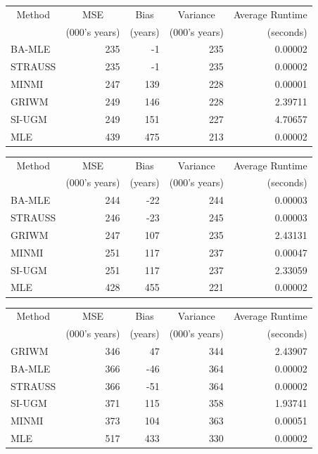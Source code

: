 \documentclass[
]{article}
\begin{document}
\begin{tabular}{lrrrr}
\toprule
\multicolumn{1}{c}{Method} & \multicolumn{1}{c}{MSE} & \multicolumn{1}{c}{Bias} & \multicolumn{1}{c}{Variance} & \multicolumn{1}{c}{Average Runtime} \\
\cmidrule(l{3pt}r{3pt}){1-1} \cmidrule(l{3pt}r{3pt}){2-2} \cmidrule(l{3pt}r{3pt}){3-3} \cmidrule(l{3pt}r{3pt}){4-4} \cmidrule(l{3pt}r{3pt}){5-5}
 & (000's years) & (years) & (000's years) & (seconds)\\
\midrule
BA-MLE & 235 & -1 & 235 & 0.00002\\
STRAUSS & 235 & -1 & 235 & 0.00002\\
MINMI & 247 & 139 & 228 & 0.00001\\
GRIWM & 249 & 146 & 228 & 2.39711\\
SI-UGM & 249 & 151 & 227 & 4.70657\\
\addlinespace
MLE & 439 & 475 & 213 & 0.00002\\
\bottomrule
\end{tabular}

\begin{tabular}{lrrrr}
\toprule
\multicolumn{1}{c}{Method} & \multicolumn{1}{c}{MSE} & \multicolumn{1}{c}{Bias} & \multicolumn{1}{c}{Variance} & \multicolumn{1}{c}{Average Runtime} \\
\cmidrule(l{3pt}r{3pt}){1-1} \cmidrule(l{3pt}r{3pt}){2-2} \cmidrule(l{3pt}r{3pt}){3-3} \cmidrule(l{3pt}r{3pt}){4-4} \cmidrule(l{3pt}r{3pt}){5-5}
 & (000's years) & (years) & (000's years) & (seconds)\\
\midrule
BA-MLE & 244 & -22 & 244 & 0.00003\\
STRAUSS & 246 & -23 & 245 & 0.00003\\
GRIWM & 247 & 107 & 235 & 2.43131\\
MINMI & 251 & 117 & 237 & 0.00047\\
SI-UGM & 251 & 117 & 237 & 2.33059\\
\addlinespace
MLE & 428 & 455 & 221 & 0.00002\\
\bottomrule
\end{tabular}

\begin{tabular}{lrrrr}
\toprule
\multicolumn{1}{c}{Method} & \multicolumn{1}{c}{MSE} & \multicolumn{1}{c}{Bias} & \multicolumn{1}{c}{Variance} & \multicolumn{1}{c}{Average Runtime} \\
\cmidrule(l{3pt}r{3pt}){1-1} \cmidrule(l{3pt}r{3pt}){2-2} \cmidrule(l{3pt}r{3pt}){3-3} \cmidrule(l{3pt}r{3pt}){4-4} \cmidrule(l{3pt}r{3pt}){5-5}
 & (000's years) & (years) & (000's years) & (seconds)\\
\midrule
GRIWM & 346 & 47 & 344 & 2.43907\\
BA-MLE & 366 & -46 & 364 & 0.00002\\
STRAUSS & 366 & -51 & 364 & 0.00002\\
SI-UGM & 371 & 115 & 358 & 1.93741\\
MINMI & 373 & 104 & 363 & 0.00051\\
\addlinespace
MLE & 517 & 433 & 330 & 0.00002\\
\bottomrule
\end{tabular}
\end{document}
